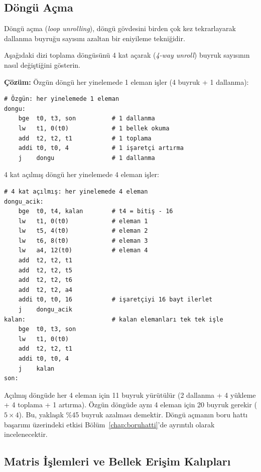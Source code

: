 \subsection{Döngü Açma}
\label{subsec:dongu-acma}

Döngü açma (\emph{loop unrolling}), döngü gövdesini birden çok kez tekrarlayarak dallanma buyruğu sayısını azaltan bir eniyileme tekniğidir.

\begin{ornek}[4.21]
\label{orn:dongu-acma}
Aşağıdaki dizi toplama döngüsünü 4 kat açarak (\emph{4-way unroll}) buyruk sayısının nasıl değiştiğini gösterin.

\textbf{Çözüm:} Özgün döngü her yinelemede 1 eleman işler (4 buyruk + 1 dallanma):

\begin{lstlisting}[style=riscv]
# Özgün: her yinelemede 1 eleman
dongu:
    bge  t0, t3, son          # 1 dallanma
    lw   t1, 0(t0)            # 1 bellek okuma
    add  t2, t2, t1           # 1 toplama
    addi t0, t0, 4            # 1 işaretçi artırma
    j    dongu                # 1 dallanma
\end{lstlisting}

4 kat açılmış döngü her yinelemede 4 eleman işler:

\begin{lstlisting}[style=riscv]
# 4 kat açılmış: her yinelemede 4 eleman
dongu_acik:
    bge  t0, t4, kalan        # t4 = bitiş - 16
    lw   t1, 0(t0)            # eleman 1
    lw   t5, 4(t0)            # eleman 2
    lw   t6, 8(t0)            # eleman 3
    lw   a4, 12(t0)           # eleman 4
    add  t2, t2, t1
    add  t2, t2, t5
    add  t2, t2, t6
    add  t2, t2, a4
    addi t0, t0, 16           # işaretçiyi 16 bayt ilerlet
    j    dongu_acik
kalan:                        # kalan elemanları tek tek işle
    bge  t0, t3, son
    lw   t1, 0(t0)
    add  t2, t2, t1
    addi t0, t0, 4
    j    kalan
son:
\end{lstlisting}

Açılmış döngüde her 4 eleman için 11 buyruk yürütülür (2 dallanma + 4 yükleme + 4 toplama + 1 artırma). Özgün döngüde aynı 4 eleman için 20 buyruk gerekir ($5 \times 4$). Bu, yaklaşık \%45 buyruk azalması demektir. Döngü açmanın boru hattı başarımı üzerindeki etkisi Bölüm~\ref{chap:boruhatti}'de ayrıntılı olarak incelenecektir.
\end{ornek}


\subsection{Matris İşlemleri ve Bellek Erişim Kalıpları}
\label{subsec:matris-erişim}

